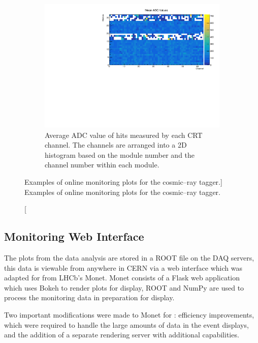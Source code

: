 \begin{figure}
	\begin{subfigure}[b]{0.8\textwidth}
		\centering
		\vspace{3mm}
		\includegraphics[width=\textwidth]{figures/crt_adc_om.pdf}
		\caption {Average ADC value of hits measured by each CRT channel. The 
		channels are arranged into a 2D histogram based on the module number and the 
		channel number within each module.}
		\label{fig:crt_adc_om}
	\end{subfigure}

	\caption
	[Examples of online monitoring plots for the cosmic--ray tagger.]
	{Examples of online monitoring plots for the cosmic--ray tagger.}
	\label{fig:crt_OM}

\end{figure}

\subsection{Monitoring Web Interface}
The plots from the data analysis are stored in a ROOT file on the \protodune{}
DAQ servers, this data is viewable from anywhere in CERN via a web interface
which was adapted for \protodune{} from LHCb's Monet\cite{Adinolfi_2017}. 
Monet consists of a Flask web application\cite{flask} which uses 
Bokeh\cite{bokeh} to render plots for display, ROOT\cite{ANTCHEVA20092499} and 
NumPy\cite{numpy} are used to process the monitoring data in preparation for 
display.

Two important modifications were made to Monet for \protodune{}: efficiency 
improvements, which were required to handle the large amounts of data in the 
event displays, and the addition of a separate rendering server with 
additional capabilities. 


